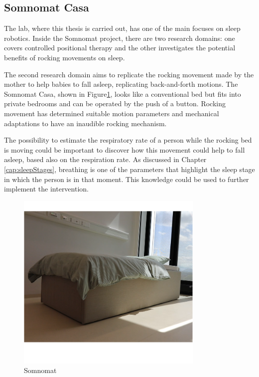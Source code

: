 \subsection{Somnomat Casa} \label{cap:Somnomat}
The lab, where this thesis is carried out, has one of the main focuses on sleep robotics. Inside the Somnomat project, there are two research domains: one covers controlled positional therapy and the other investigates the potential benefits of rocking movements on sleep.

The second research domain aims to replicate the rocking movement made by the mother to help babies to fall asleep, replicating back-and-forth motions. The Somnomat Casa, shown in Figure\ref{fig:somnomat}, looks like a conventional bed but fits into private bedrooms and can be operated by the push of a button. 
Rocking movement has determined suitable motion parameters and mechanical adaptations to have an inaudible rocking mechanism.

The possibility to estimate the respiratory rate of a person while the rocking bed is moving could be important to discover how this movement could help to fall asleep, based also on the respiration rate. As discussed in Chapter \ref{cap:sleepStages}, breathing is one of the parameters that highlight the sleep stage in which the person is in that moment. This knowledge could be used to further implement the intervention.


\begin{figure}[H]
    \centering
    \includegraphics[width=0.8\textwidth]{img/somnomat.png}
    \caption{Somnomat}
    \label{fig:somnomat}
\end{figure}


